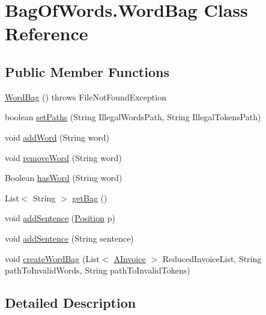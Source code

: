 \hypertarget{class_bag_of_words_1_1_word_bag}{}\section{Bag\+Of\+Words.\+Word\+Bag Class Reference}
\label{class_bag_of_words_1_1_word_bag}
\subsection*{Public Member Functions}
\begin{DoxyCompactItemize}
\item 
\hyperlink{class_bag_of_words_1_1_word_bag_a7464ca7b08fa51ee8f4967b017896a7e}{Word\+Bag} ()  throws File\+Not\+Found\+Exception
\item 
boolean \hyperlink{class_bag_of_words_1_1_word_bag_ad96f1fd5eec992c63057662c5a89e0ef}{set\+Paths} (String Illegal\+Words\+Path, String Illegal\+Tokens\+Path)
\item 
void \hyperlink{class_bag_of_words_1_1_word_bag_a3aad2cb0de46bbc029e3c8d59eb9cda3}{add\+Word} (String word)
\item 
void \hyperlink{class_bag_of_words_1_1_word_bag_a0c4bd3144d99a6b98c63f97704cfafaa}{remove\+Word} (String word)
\item 
Boolean \hyperlink{class_bag_of_words_1_1_word_bag_a1b34ea94ef1ecf6428d321b2fd5e0359}{has\+Word} (String word)
\item 
List$<$ String $>$ \hyperlink{class_bag_of_words_1_1_word_bag_ab2b3aa2a9ea3821cf365878f954a5abd}{get\+Bag} ()
\item 
void \hyperlink{class_bag_of_words_1_1_word_bag_a540190bee1fcf153d1a9f0bcb9fe2cd0}{add\+Sentence} (\hyperlink{class_reduced_invoice_1_1_position}{Position} p)
\item 
void \hyperlink{class_bag_of_words_1_1_word_bag_a9c60c49329b0ef68e47c7af85eccae00}{add\+Sentence} (String sentence)
\item 
void \hyperlink{class_bag_of_words_1_1_word_bag_ae44ab1194be23aee5c5b8f7d37658158}{create\+Word\+Bag} (List$<$ \hyperlink{class_reduced_invoice_1_1_a_invoice}{A\+Invoice} $>$ Reduced\+Invoice\+List, String path\+To\+Invalid\+Words, String path\+To\+Invalid\+Tokens)
\end{DoxyCompactItemize}


\subsection{Detailed Description}


